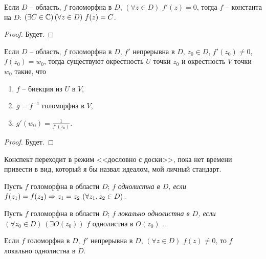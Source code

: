 \begin{theorem}
	Если $D$ -- область, $f$ голоморфна в $D$, $(\forall z \in D) \,\, f'(z) = 0$, тогда $f$ -- константа на $D$: $(\exists C \in \mathbb{C}) \, (\forall z \in D) \,\, f(z) = C$.
\end{theorem}
\begin{proof}
	Будет.
\end{proof}

\begin{theorem}
	Если $D$ -- область, $f$ голоморфна в $D$, $f'$ непрерывна в $D$, $z_0 \in D$, $f'(z_0) \neq 0$, $f(z_0) = w_0$, тогда существуют окрестность $U$ точки $z_0$ и окрестность $V$ точки $w_0$ такие, что
	\begin{enumerate}
		\item $f$ -- биекция из $U$ в $V$,
		\item $g = f^{-1}$ голоморфна в $V$,
		\item $g'(w_0) = \frac{1}{f'(z_0)}$.
	\end{enumerate}
\end{theorem}
\begin{proof}
	Будет.
\end{proof}

{\color{red} Конспект переходит в режим <<дословно с доски>>, пока нет времени привести в вид, который я бы назвал идеалом, мой личный стандарт.} %

\begin{definition}
	Пусть $f$ голоморфна в области $D$; $f$ \it{однолистна} в $D$, если $f(z_1) = f(z_2) \Rightarrow z_1 = z_2 \,\, (\forall z_1, z_2 \in D)$. %
\end{definition}

\begin{definition}
	Пусть $f$ голоморфна в области $D$; $f$ \it{локально однолистна} в $D$, если $(\forall z_0 \in D) \, (\exists O(z_0)) \,\, f \text{ однолистна в $O(z_0)$}$ . %
\end{definition}

\begin{note}
	Если $f$ голоморфна в $D$, $f'$ непрерывна в $D$, $(\forall z \in D) \,\, f(z) \ne 0$, то $f$ локально однолистна в $D$.
\end{note}

